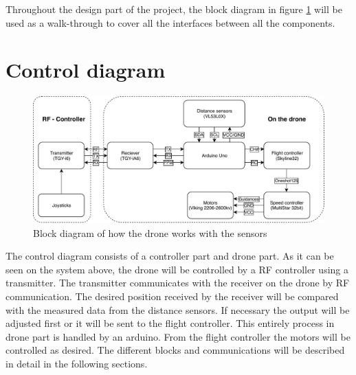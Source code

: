 Throughout the design part of the project, the block diagram in figure \ref{fig:block_diagram} will be used as a walk-through to cover all the interfaces between all the components. 
\section{Control diagram}

\begin{figure}[H]
    \centering
    \includegraphics[width=\textwidth]{figures/ch_design/Block-diagram.pdf}
    \caption{Block diagram of how the drone works with the sensors}
    \label{fig:block_diagram}
\end{figure}

The control diagram consists of a controller part and drone part. As it can be seen on the system above, the drone will be controlled by a RF controller using a transmitter. The transmitter communicates with the receiver on the drone by RF communication. The desired position received by the receiver will be compared with the measured data from the distance sensors. If necessary the output will be adjusted first or it will be sent to the flight controller. This entirely process in drone part is handled by an arduino. From the flight controller the motors will be controlled as desired. The different blocks and communications will be described in detail in the following sections. 